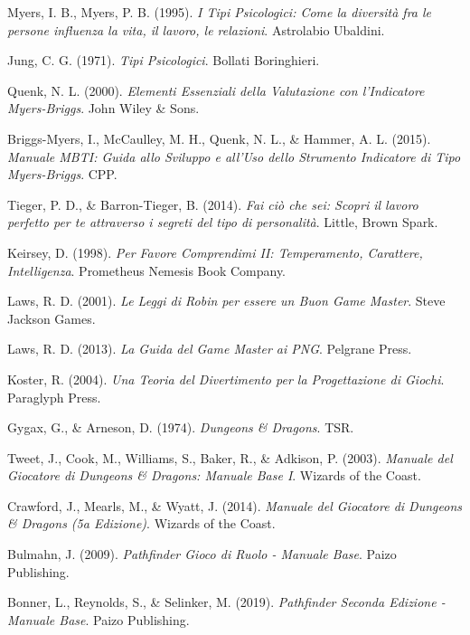 Myers, I. B., Myers, P. B. (1995). 
\textit{I Tipi Psicologici: Come la diversità fra le persone influenza la vita, il lavoro, le relazioni}. 
Astrolabio Ubaldini.

Jung, C. G. (1971). 
\textit{Tipi Psicologici}. 
Bollati Boringhieri.

Quenk, N. L. (2000). 
\textit{Elementi Essenziali della Valutazione con l'Indicatore Myers-Briggs}. 
John Wiley \& Sons.

Briggs-Myers, I., McCaulley, M. H., Quenk, N. L., \& Hammer, A. L. (2015). 
\textit{Manuale MBTI: Guida allo Sviluppo e all'Uso dello Strumento Indicatore di Tipo Myers-Briggs}. 
CPP.

Tieger, P. D., \& Barron-Tieger, B. (2014). 
\textit{Fai ciò che sei: Scopri il lavoro perfetto per te attraverso i segreti del tipo di personalità}. 
Little, Brown Spark.

Keirsey, D. (1998). 
\textit{Per Favore Comprendimi II: Temperamento, Carattere, Intelligenza}. 
Prometheus Nemesis Book Company.

Laws, R. D. (2001). 
\textit{Le Leggi di Robin per essere un Buon Game Master}. 
Steve Jackson Games.

Laws, R. D. (2013). 
\textit{La Guida del Game Master ai PNG}. 
Pelgrane Press.

Koster, R. (2004). 
\textit{Una Teoria del Divertimento per la Progettazione di Giochi}. 
Paraglyph Press.

Gygax, G., \& Arneson, D. (1974).
\textit{Dungeons \& Dragons}.
TSR.

Tweet, J., Cook, M., Williams, S., Baker, R., \& Adkison, P. (2003).
\textit{Manuale del Giocatore di Dungeons \& Dragons: Manuale Base I}.
Wizards of the Coast.

Crawford, J., Mearls, M., \& Wyatt, J. (2014).
\textit{Manuale del Giocatore di Dungeons \& Dragons (5a Edizione)}.
Wizards of the Coast.

Bulmahn, J. (2009).
\textit{Pathfinder Gioco di Ruolo - Manuale Base}.
Paizo Publishing.

Bonner, L., Reynolds, S., \& Selinker, M. (2019).
\textit{Pathfinder Seconda Edizione - Manuale Base}.
Paizo Publishing.


